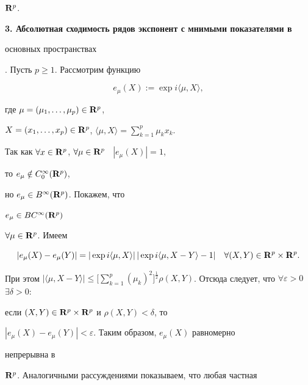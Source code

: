 ${\bold R}^p$.


\medskip





{\bf 3. Абсолютная сходимость рядов экспонент с мнимыми показателями в


основных пространствах}. Пусть $p\geqslant 1$. Рассмотрим функцию


$$


e_{\mu}(X):=\exp i\langle\mu,X\rangle,


$$


где $\mu=(\mu_1,\dotsc,\mu_p)\in {\bold R}^p$, 


$X=(x_1,\dotsc,x_p)\in {\bold


R}^p$, $\langle\mu, X\rangle=\sum\limits_{k=1}^p \mu_k x_k$.





Так как $\forall x\in {\bold R}^p$, $\forall


\mu\in {\bold R}^p$ \ $|e_{\mu}(X)|=1$,


то $e_{\mu}\notin C_0^{\infty}({\bold R}^p)$,


но $e_{\mu}\in B^{\infty}({\bold R}^p)$. Покажем, что


$e_{\mu}\in BC^{\infty}({\bold R}^p)$


$\forall\mu\in {\bold R}^p$. Имеем





$$


|e_{\mu}(X)-e_{\mu}(Y)|=|\exp i\langle\mu,X\rangle|\,|\exp


i\langle\mu,X-Y\rangle -1|\quad


\forall(X,Y)\in {\bold R}^p\times {\bold R}^p.


$$


При этом $|\langle\mu,X-Y


\rangle|\leqslant\Big[\sum\limits_{k=1}^p(\mu_k)^2\Big]^{\frac{1}{2}}


\rho


(X,Y)$. Отсюда следует, что $\forall \varepsilon >0$ \; $\exists\delta >0:$


если $(X,Y)\in {\bold R}^p\times {\bold R}^p$ и $\rho(X,Y)<\delta$, то


$|e_{\mu}(X)-e_{\mu}(Y)|<\varepsilon$. Таким образом, $e_{\mu}(X)$ равномерно


непрерывна в


${\bold R}^p$. Аналогичными рассуждениями показываем, что любая частная


